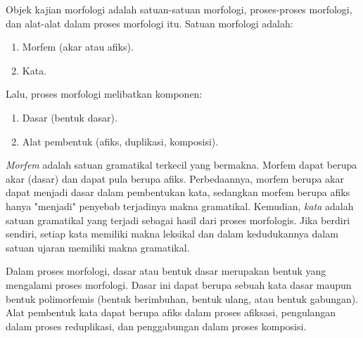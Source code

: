 %
%
%
%
%
%
%

Objek kajian morfologi adalah satuan-satuan morfologi, proses-proses morfologi, dan alat-alat dalam proses morfologi itu\cite{chaer:08:morfologi}. Satuan morfologi adalah:

\begin{enumerate}
	\item Morfem (akar atau afiks).
	\item Kata.
\end{enumerate}

Lalu, proses morfologi melibatkan komponen:

\begin{enumerate}
	\item Dasar (bentuk dasar).
	\item Alat pembentuk (afiks, duplikasi, komposisi).
\end{enumerate}

\textit{Morfem} adalah satuan gramatikal terkecil yang bermakna. Morfem dapat berupa akar (dasar) dan dapat pula berupa afiks. Perbedaannya, morfem berupa akar dapat menjadi dasar dalam pembentukan kata, sedangkan morfem berupa afiks hanya "menjadi" penyebab terjadinya makna gramatikal. Kemudian, \textit{kata} adalah satuan gramatikal yang terjadi sebagai hasil dari proses morfologis. Jika berdiri sendiri, setiap kata memiliki makna leksikal dan dalam kedudukannya dalam satuan ujaran memiliki makna gramatikal.

Dalam proses morfologi, dasar atau bentuk dasar merupakan bentuk yang mengalami proses morfologi. Dasar ini dapat berupa sebuah kata dasar maupun bentuk polimorfemis (bentuk berimbuhan, bentuk ulang, atau bentuk gabungan). Alat pembentuk kata dapat berupa afiks dalam proses afiksasi, pengulangan dalam proses reduplikasi, dan penggabungan dalam proses komposisi. 

